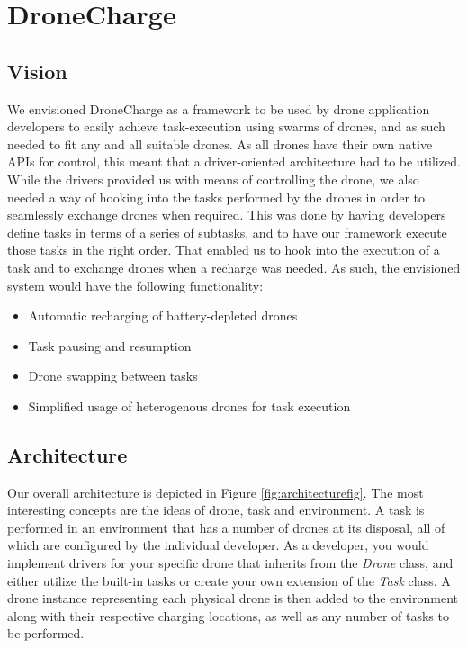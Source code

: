 \section{DroneCharge}
\subsection{Vision}
We envisioned DroneCharge as a framework to be used by drone application developers to easily achieve task-execution using swarms of drones, and as such needed to fit any and all suitable drones. As all drones have their own native APIs for control, this meant that a driver-oriented architecture had to be utilized. While the drivers provided us with means of controlling the drone, we also needed a way of hooking into the tasks performed by the drones in order to seamlessly exchange drones when required. This was done by having developers define tasks in terms of a series of subtasks, and to have our framework execute those tasks in the right order. That enabled us to hook into the execution of a task and to exchange drones when a recharge was needed. As such, the envisioned system would have the following functionality:

\begin{itemize}
    \itemsep0em
	\item Automatic recharging of battery-depleted drones
	\item Task pausing and resumption
	\item Drone swapping between tasks
	\item Simplified usage of heterogenous drones for task execution
\end{itemize}

\subsection{Architecture}
Our overall architecture is depicted in Figure \ref{fig:architecturefig}. The most interesting concepts are the ideas of drone, task and environment. A task is performed in an environment that has a number of drones at its disposal, all of which are configured by the individual developer. As a developer, you would implement drivers for your specific drone that inherits from the \textit{Drone} class, and either utilize the built-in tasks or create your own extension of the \textit{Task} class. A drone instance representing each physical drone is then added to the environment along with their respective charging locations, as well as any number of tasks to be performed.

